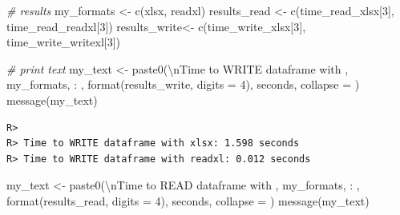 \documentclass[
  11pt,
]{book}
\newenvironment{Shaded}{\begin{snugshade}}{\end{snugshade}}
\newcommand{\AttributeTok}[1]{\textcolor[rgb]{0.61,0.61,0.61}{#1}}
\newcommand{\CommentTok}[1]{\textcolor[rgb]{0.37,0.37,0.37}{\textit{#1}}}
\newcommand{\DecValTok}[1]{\textcolor[rgb]{0.06,0.06,0.06}{#1}}
\newcommand{\FunctionTok}[1]{\textcolor[rgb]{0,0,0}{#1}}
\newcommand{\NormalTok}[1]{#1}
\newcommand{\OtherTok}[1]{\textcolor[rgb]{0.37,0.37,0.37}{#1}}
\newcommand{\SpecialCharTok}[1]{\textcolor[rgb]{0,0,0}{#1}}
\newcommand{\StringTok}[1]{\textcolor[rgb]{0.5,0.5,0.5}{#1}}
\begin{document}
\begin{Shaded}
\begin{Highlighting}[]
\CommentTok{\# results}
\NormalTok{my\_formats }\OtherTok{\textless{}{-}} \FunctionTok{c}\NormalTok{(}\StringTok{\textquotesingle{}xlsx\textquotesingle{}}\NormalTok{, }\StringTok{\textquotesingle{}readxl\textquotesingle{}}\NormalTok{)}
\NormalTok{results\_read }\OtherTok{\textless{}{-}} \FunctionTok{c}\NormalTok{(time\_read\_xlsx[}\DecValTok{3}\NormalTok{], time\_read\_readxl[}\DecValTok{3}\NormalTok{])}
\NormalTok{results\_write}\OtherTok{\textless{}{-}} \FunctionTok{c}\NormalTok{(time\_write\_xlsx[}\DecValTok{3}\NormalTok{], time\_write\_writexl[}\DecValTok{3}\NormalTok{])}

\CommentTok{\# print text}
\NormalTok{my\_text }\OtherTok{\textless{}{-}} \FunctionTok{paste0}\NormalTok{(}\StringTok{\textquotesingle{}}\SpecialCharTok{\textbackslash{}n}\StringTok{Time to WRITE dataframe with \textquotesingle{}}\NormalTok{,}
\NormalTok{                  my\_formats, }\StringTok{\textquotesingle{}: \textquotesingle{}}\NormalTok{,}
                  \FunctionTok{format}\NormalTok{(results\_write, }\AttributeTok{digits =} \DecValTok{4}\NormalTok{),}
                  \StringTok{\textquotesingle{} seconds\textquotesingle{}}\NormalTok{, }\AttributeTok{collapse =} \StringTok{\textquotesingle{}\textquotesingle{}}\NormalTok{)}
\FunctionTok{message}\NormalTok{(my\_text)}
\end{Highlighting}
\end{Shaded}

\begin{verbatim}
R> 
R> Time to WRITE dataframe with xlsx: 1.598 seconds
R> Time to WRITE dataframe with readxl: 0.012 seconds
\end{verbatim}

\begin{Shaded}
\begin{Highlighting}[]
\NormalTok{my\_text }\OtherTok{\textless{}{-}} \FunctionTok{paste0}\NormalTok{(}\StringTok{\textquotesingle{}}\SpecialCharTok{\textbackslash{}n}\StringTok{Time to READ dataframe with \textquotesingle{}}\NormalTok{,}
\NormalTok{                  my\_formats, }\StringTok{\textquotesingle{}: \textquotesingle{}}\NormalTok{,}
                  \FunctionTok{format}\NormalTok{(results\_read, }\AttributeTok{digits =} \DecValTok{4}\NormalTok{),}
                  \StringTok{\textquotesingle{} seconds\textquotesingle{}}\NormalTok{, }\AttributeTok{collapse =} \StringTok{\textquotesingle{}\textquotesingle{}}\NormalTok{)}
\FunctionTok{message}\NormalTok{(my\_text)}
\end{Highlighting}
\end{Shaded}
\end{document}
